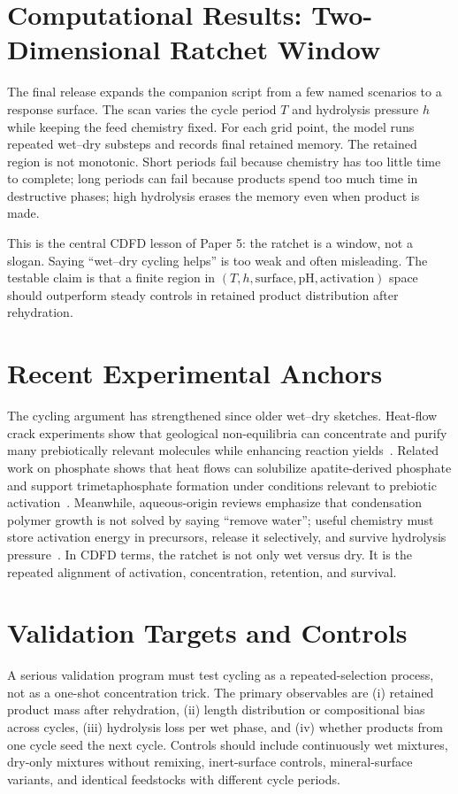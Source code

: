 \documentclass[11pt,a4paper]{article}
\begin{document}
\section{Computational Results: Two-Dimensional Ratchet Window}
The final release expands the companion script from a few named scenarios to a
response surface. The scan varies the cycle period $T$ and hydrolysis pressure
$h$ while keeping the feed chemistry fixed. For each grid point, the model runs
repeated wet--dry substeps and records final retained memory. The retained
region is not monotonic. Short periods fail because chemistry has too little
time to complete; long periods can fail because products spend too much time in
destructive phases; high hydrolysis erases the memory even when product is made.

This is the central CDFD lesson of Paper 5: the ratchet is a window, not a
slogan. Saying ``wet--dry cycling helps'' is too weak and often misleading. The
testable claim is that a finite region in $(T,h,\mathrm{surface},\mathrm{pH},
\mathrm{activation})$ space should outperform steady controls in retained
product distribution after rehydration.

\section{Recent Experimental Anchors}
The cycling argument has strengthened since older wet--dry sketches. Heat-flow crack experiments show that geological non-equilibria can concentrate and purify many prebiotically relevant molecules while enhancing reaction yields~\cite{Matreux2024}. Related work on phosphate shows that heat flows can solubilize apatite-derived phosphate and support trimetaphosphate formation under conditions relevant to prebiotic activation~\cite{Matreux2025Phosphate}. Meanwhile, aqueous-origin reviews emphasize that condensation polymer growth is not solved by saying ``remove water''; useful chemistry must store activation energy in precursors, release it selectively, and survive hydrolysis pressure~\cite{WhitakerPowner2024}. In CDFD terms, the ratchet is not only wet versus dry. It is the repeated alignment of activation, concentration, retention, and survival.

\section{Validation Targets and Controls}
A serious validation program must test cycling as a repeated-selection process, not as a one-shot concentration trick. The primary observables are (i) retained product mass after rehydration, (ii) length distribution or compositional bias across cycles, (iii) hydrolysis loss per wet phase, and (iv) whether products from one cycle seed the next cycle. Controls should include continuously wet mixtures, dry-only mixtures without remixing, inert-surface controls, mineral-surface variants, and identical feedstocks with different cycle periods.
\end{document}
